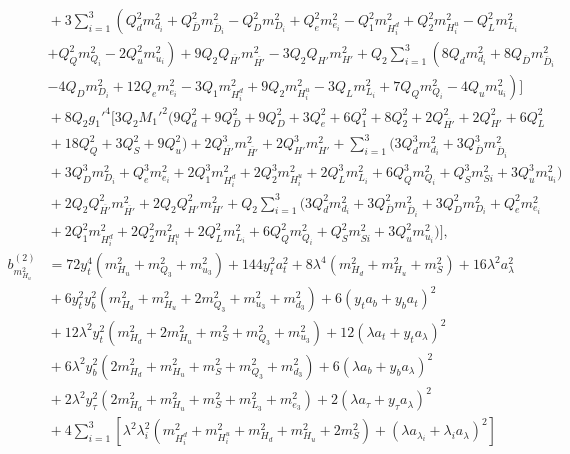 \documentclass[preprint,amsmath,amssymb,aps,superscriptaddress,prd,showpacs,floatfix,nofootinbib]{revtex4-1}
\begin{document}
\begin{subequations}
\begin{align}
&{}+3\sum_{i=1}^3\left ( Q_d^2m_{d_i}^2+Q_{\overline{D}}^2m_{\overline{D}_i}^2-Q_D^2m_{D_i}^2+Q_e^2m_{e_i}^2-Q_1^2m_{H_i^d}^2+Q_2^2m_{H_i^u}^2-Q_L^2m_{L_i}^2\right.\nonumber\\
&{}\left.+Q_Q^2m_{Q_i}^2-2Q_u^2m_{u_i}^2\right )+9Q_2Q_{\overline{H'}}m_{\overline{H'}}^2-3Q_2Q_{H'}m_{H'}^2+Q_2\sum_{i=1}^3\left ( 8Q_dm_{d_i}^2+8Q_{\overline{D}}m_{\overline{D}_i}^2\right.\nonumber\\
&{}\left.-4Q_Dm_{D_i}^2+12Q_em_{e_i}^2-3Q_1m_{H_i^d}^2+9Q_2m_{H_i^u}^2-3Q_Lm_{L_i}^2+7Q_Qm_{Q_i}^2-4Q_um_{u_i}^2\right )\bigg ]\nonumber\\
&{}+8Q_2g_1'^4\bigg [ 3Q_2M_1'^2\big ( 9Q_d^2+9Q_{\overline{D}}^2+9Q_D^2+3Q_e^2+6Q_1^2+8Q_2^2+2Q_{\overline{H'}}^2+2Q_{H'}^2+6Q_L^2\nonumber\\
&{}+18Q_Q^2+3Q_S^2+9Q_u^2\big )+2Q_{\overline{H'}}^3m_{\overline{H'}}^2+2Q_{H'}^3m_{H'}^2+\sum_{i=1}^3\big ( 3Q_d^3m_{d_i}^2+3Q_{\overline{D}}^3m_{\overline{D}_i}^2\nonumber\\
&{}+3Q_D^3m_{D_i}^2+Q_e^3m_{e_i}^2+2Q_1^3m_{H_i^d}^2+2Q_2^3m_{H_i^u}^2+2Q_L^3m_{L_i}^2+6Q_Q^3m_{Q_i}^2+Q_S^3m_{Si}^2+3Q_u^3m_{u_i}^2\big )\nonumber\\
&{}+2Q_2Q_{\overline{H'}}^2m_{\overline{H'}}^2+2Q_2Q_{H'}^2m_{H'}^2+Q_2\sum_{i=1}^3\big ( 3Q_d^2m_{d_i}^2+3Q_{\overline{D}}^2m_{\overline{D}_i}^2+3Q_D^2m_{D_i}^2+Q_e^2m_{e_i}^2\nonumber\\
&{}+2Q_1^2m_{H_i^d}^2+2Q_2^2m_{H_i^u}^2+2Q_L^2m_{L_i}^2+6Q_Q^2m_{Q_i}^2+Q_S^2m_{Si}^2+3Q_u^2m_{u_i}^2\big )\bigg ],\label{eq:USSMmHu2BetaTwoLoop}\\
b_{m_{H_u}^2}^{(2)}&=72y_t^4\left ( m_{H_u}^2+m_{Q_3}^2+m_{u_3}^2\right )+144y_t^2a_t^2+8\lambda^4\left ( m_{H_d}^2+m_{H_u}^2+m_S^2\right )+16\lambda^2a_\lambda^2\nonumber\\
&{}+6y_t^2y_b^2\left ( m_{H_d}^2+m_{H_u}^2+2m_{Q_3}^2+m_{u_3}^2+m_{d_3}^2\right )+6\left ( y_ta_b+y_ba_t\right )^2\nonumber\\
&{}+12\lambda^2y_t^2\left ( m_{H_d}^2+2m_{H_u}^2+m_S^2+m_{Q_3}^2+m_{u_3}^2\right )+12\left ( \lambda a_t+y_ta_\lambda\right )^2\nonumber\\
&{}+6\lambda^2y_b^2\left ( 2m_{H_d}^2+m_{H_u}^2+m_S^2+m_{Q_3}^2+m_{d_3}^2\right )+6\left ( \lambda a_b+y_ba_\lambda\right )^2\nonumber\\
&{}+2\lambda^2y_\tau^2\left ( 2m_{H_d}^2+m_{H_u}^2+m_S^2+m_{L_3}^2+m_{e_3}^2\right )+2\left ( \lambda a_\tau+y_\tau a_\lambda\right )^2\nonumber\\
&{}+4\sum_{i=1}^3 \left [ \lambda^2\lambda_i^2\left ( m_{H_i^d}^2+m_{H_i^u}^2+m_{H_d}^2+m_{H_u}^2+2m_S^2\right )+\left ( \lambda a_{\lambda_i}+\lambda_i a_{\lambda}\right )^2\right ] \nonumber\\

\end{align}
\end{subequations}
\end{document}
